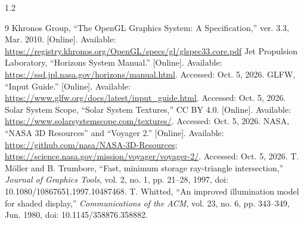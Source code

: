 \documentclass[12pt,a4paper,oneside]{report}
\begin{document}
\renewcommand{\bibname}{REFERENCES}
\titleformat{\chapter}[block]{\centering\bfseries\fontsize{14}{21}\selectfont}{}{0pt}{}
\titlespacing*{\chapter}{0pt}{0pt}{36pt}
\begin{spacing}{1.2}
\begin{thebibliography}{9}
\label{references}
\setlength{\itemsep}{6pt}\setlength{\parskip}{0pt}
 Khronos Group, ``The OpenGL Graphics System: A Specification,'' ver. 3.3, Mar. 2010. [Online]. Available: \url{https://registry.khronos.org/OpenGL/specs/gl/glspec33.core.pdf}
 Jet Propulsion Laboratory, ``Horizons System Manual.'' [Online]. Available: \url{https://ssd.jpl.nasa.gov/horizons/manual.html}. Accessed: Oct. 5, 2026.
 GLFW, ``Input Guide.'' [Online]. Available: \url{https://www.glfw.org/docs/latest/input_guide.html}. Accessed: Oct. 5, 2026.
 Solar System Scope, ``Solar System Textures,'' CC BY 4.0. [Online]. Available: \url{https://www.solarsystemscope.com/textures/}. Accessed: Oct. 5, 2026.
 NASA, ``NASA 3D Resources'' and ``Voyager 2.'' [Online]. Available: \url{https://github.com/nasa/NASA-3D-Resources}; \url{https://science.nasa.gov/mission/voyager/voyager-2/}. Accessed: Oct. 5, 2026.
 T. Möller and B. Trumbore, ``Fast, minimum storage ray-triangle intersection,'' \emph{Journal of Graphics Tools}, vol. 2, no. 1, pp. 21--28, 1997, doi: 10.1080/10867651.1997.10487468.
 T. Whitted, ``An improved illumination model for shaded display,'' \emph{Communications of the ACM}, vol. 23, no. 6, pp. 343--349, Jun. 1980, doi: 10.1145/358876.358882.

\end{thebibliography}
\end{spacing}
\end{document}

